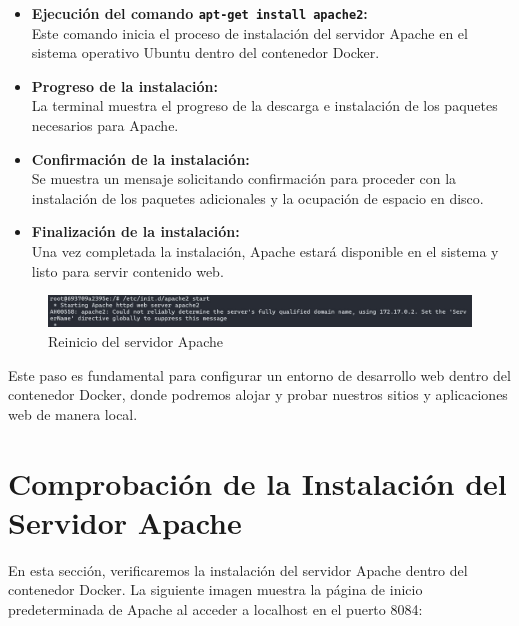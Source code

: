 \documentclass{article}
\begin{document}
\begin{itemize}
    \item \textbf{Ejecución del comando \texttt{apt-get install apache2}:} \\
    Este comando inicia el proceso de instalación del servidor Apache en el sistema operativo Ubuntu dentro del contenedor Docker.

    \item \textbf{Progreso de la instalación:} \\
    La terminal muestra el progreso de la descarga e instalación de los paquetes necesarios para Apache.

    \item \textbf{Confirmación de la instalación:} \\
    Se muestra un mensaje solicitando confirmación para proceder con la instalación de los paquetes adicionales y la ocupación de espacio en disco.

    \item \textbf{Finalización de la instalación:} \\
    Una vez completada la instalación, Apache estará disponible en el sistema y listo para servir contenido web.
\end{itemize}

\begin{figure}[htbp]
    \centering
    \includegraphics[width=1\linewidth]{latex/img/apache2.jpeg}
    \caption{Reinicio del servidor Apache}
    \label{fig:apache_restart}
\end{figure}

Este paso es fundamental para configurar un entorno de desarrollo web dentro del contenedor Docker, donde podremos alojar y probar nuestros sitios y aplicaciones web de manera local.

\clearpage

\section{Comprobación de la Instalación del Servidor Apache}

En esta sección, verificaremos la instalación del servidor Apache dentro del contenedor Docker. La siguiente imagen muestra la página de inicio predeterminada de Apache al acceder a localhost en el puerto 8084:
\end{document}
